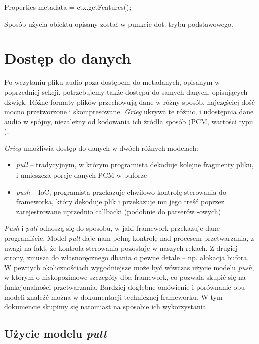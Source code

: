 \begin{java}
Properties metadata = ctx.getFeatures();
\end{java}

Sposób użycia obiektu  opisany został w punkcie dot. trybu podstawowego.

\section{Dostęp do danych}

Po wczytaniu pliku audio poza dostępem do metadanych, opisanym w poprzedniej sekcji, potrzebujemy
także dostępu do samych danych, opisujących dźwięk. Różne formaty plików przechowują dane w różny
sposób, najczęściej dość mocno przetworzone i skompresowane. \emph{Grieg} ukrywa te różnic, i
udostępnia dane audio w spójny, niezależny od kodowania ich źródła sposób (PCM, wartości typu
).

\emph{Grieg} umożliwia dostęp do danych w dwóch różnych modelach:

\begin{itemize}

  \item \emph{pull} -- tradycyjnym, w którym programista dekoduje kolejne fragmenty pliku, i
    umieszcza porcje danych PCM w buforze

  \item \emph{push} -- IoC, programista przekazuje chwilowo kontrolę sterowania do frameworka, który
    dekoduje plik i przekazuje mu jego treść poprzez zarejestrowane uprzednio callbacki (podobnie do
    parserów -owych)

\end{itemize}

\emph{Push} i \emph{pull} odnoszą się do sposobu, w jaki framework przekazuje dane programiście.
Model \emph{pull} daje nam pełną kontrolę nad procesem przetwarzania, z uwagi na fakt, że kontrola
sterowania pozostaje w naszych rękach. Z drugiej strony, zmusza do własnoręcznego dbania o pewne
detale -- np.  alokacja bufora. W pewnych okolicznościach wygodniejsze może być wówczas użycie
modelu \emph{push}, w którym o niskopozimowe szczegóły dba framework, co pozwala skupić się na
funkcjonalności przetwarzania. Bardziej dogłębne omówienie i porównanie obu modeli znaleźć można w
dokumentacji technicznej frameworku. W tym dokumencie skupimy się natomiast na sposobie ich
wykorzystania.

\subsection{Użycie modelu \emph{pull}}

